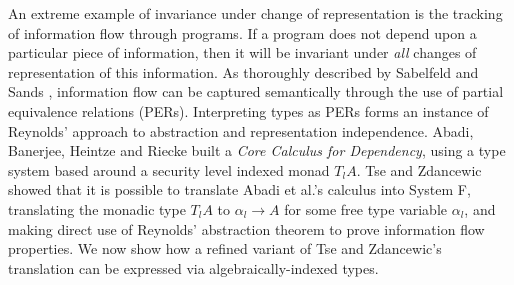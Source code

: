 
An extreme example of invariance under change of representation is the
tracking of information flow through programs. If a program does not
depend upon a particular piece of information, then it will be
invariant under \emph{all} changes of representation of this
information. As thoroughly described by Sabelfeld and Sands
\cite{sabelfeld01per}, information flow can be captured semantically
through the use of partial equivalence relations (PERs). Interpreting
types as PERs forms an instance of Reynolds' approach to abstraction
and representation independence. Abadi, Banerjee, Heintze and Riecke
\cite{abadi99core} built a \emph{Core Calculus for Dependency}, using
a type system based around a security level indexed monad $T_lA$. Tse
and Zdancewic \cite{tse04translating} showed that it is possible to
translate Abadi et al.'s calculus into System F, translating the
monadic type $T_lA$ to $\alpha_l \to A$ for some free type variable
$\alpha_l$, and making direct use of Reynolds' abstraction theorem to
prove information flow properties. We now show how a refined variant
of Tse and Zdancewic's translation can be expressed via
algebraically-indexed types.

